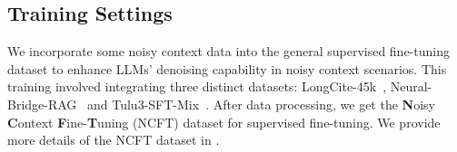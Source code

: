 \begin{table*}[t]
\centering
\renewcommand{\arraystretch}{1.0}
\setlength\tabcolsep{9.6pt}
\caption{Performance of Llama3.1-OpAmp-8B on various noisy context benchmarks. 
We present a detailed comparison of the Llama3.1-OpAmp-8B with various open-source LLMs with similar parameters. 
We bold the highest scores among all models.}
\label{table:main_small}
\end{table*}

\subsection{Training Settings}

We incorporate some noisy context data into the general supervised fine-tuning dataset to enhance LLMs' denoising capability in noisy context scenarios.
This training involved integrating three distinct datasets: LongCite-45k~\cite{zhang2024longcite}, Neural-Bridge-RAG~\cite{NeuralBridge2024ragdataset} and Tulu3-SFT-Mix~\cite{lambert2024tulu3}.
After data processing, we get the \textbf{N}oisy \textbf{C}ontext \textbf{F}ine-\textbf{T}uning (NCFT) dataset for supervised fine-tuning. 
We provide more details of the NCFT dataset in .

